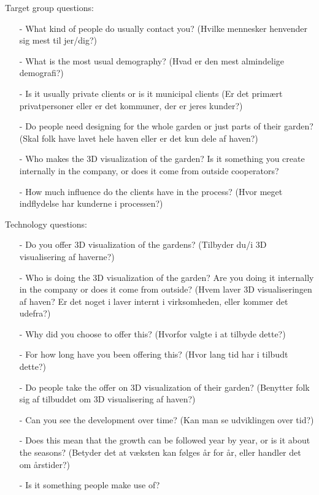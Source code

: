 Target group questions:
\begin{itemize}
	\item[-] What kind of people do usually contact you? (Hvilke mennesker henvender sig mest til jer/dig?)
	\item[-] What is the most usual demography? (Hvad er den mest almindelige demografi?)
	\item[-] Is it usually private clients or is it municipal clients (Er det primært privatpersoner eller er det kommuner, der er jeres kunder?)
	\item[-] Do people need designing for the whole garden or just parts of their garden? (Skal folk have lavet hele haven eller er det kun dele af haven?)
	\item[-] Who makes the 3D visualization of the garden? Is it something you create internally in the company, or does it come from outside cooperators? 
	\item[-] How much influence do the clients have in the process? (Hvor meget indflydelse har kunderne i processen?)\\
\end{itemize}

Technology questions:
\begin{itemize}
	\item[-] Do you offer 3D visualization of the gardens? (Tilbyder du/i 3D visualisering af haverne?)
	\item[-] Who is doing the 3D visualization of the garden? Are you doing it internally in the company or does it come from outside? (Hvem laver 3D visualiseringen af haven? Er det noget i laver internt i virksomheden, eller kommer det udefra?)
	\item[-] Why did you choose to offer this? (Hvorfor valgte i at tilbyde dette?)
	\item[-] For how long have you been offering this? (Hvor lang tid har i tilbudt dette?)
	\item[-] Do people take the offer on 3D visualization of their garden? (Benytter folk sig af tilbuddet om 3D visualisering af haven?)
	\item[-] Can you see the development over time? (Kan man se udviklingen over tid?)
	\item[-] Does this mean that the growth can be followed year by year, or is it about the seasons? (Betyder det at væksten kan følges år for år, eller handler det om årstider?)
	\item[-] Is it something people make use of?\\
\end{itemize}

